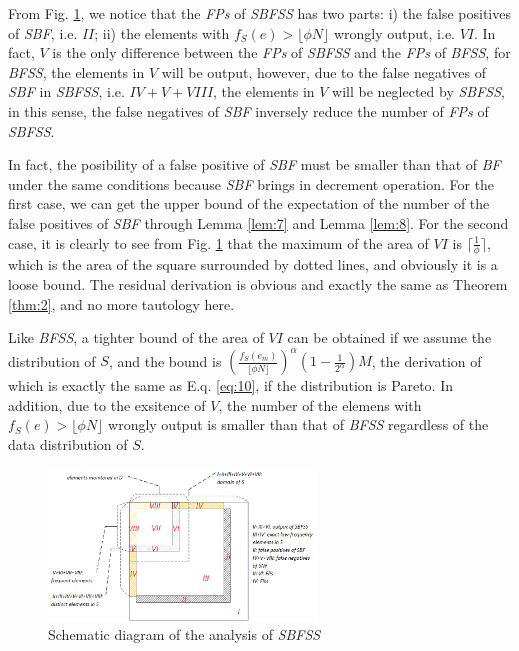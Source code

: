 \documentclass[conference]{IEEEtran}
\begin{document}
\begin{IEEEproof}
From Fig. \ref{fig:sbfss}, we notice that the \emph{FPs} of \emph{SBFSS} has two parts: i) the false positives of \emph{SBF}, i.e. $II$; ii) the elements with $f_S(e)>\lfloor\phi N\rfloor$ wrongly output, i.e. $VI$. In fact, $V$ is the only difference between the \emph{FPs} of \emph{SBFSS} and the \emph{FPs} of \emph{BFSS}, for \emph{BFSS}, the elements in $V$ will be output, however, due to the false negatives of \emph{SBF} in \emph{SBFSS}, i.e. $IV+V+VIII$, the elements in $V$ will be neglected by \emph{SBFSS}, in this sense, the false negatives of \emph{SBF} inversely reduce the number of \emph{FPs} of \emph{SBFSS}. \par
In fact, the posibility of a false positive of \emph{SBF} must be smaller than that of \emph{BF} under the same conditions because \emph{SBF} brings in decrement operation. For the first case, we can get the upper bound of the expectation of the number of the false positives of \emph{SBF} through Lemma \ref{lem:7} and Lemma \ref{lem:8}. For the second case, it is clearly to see from Fig. \ref{fig:sbfss} that the maximum of the area of $VI$ is $\lceil\frac{1}{\phi}\rceil$, which is the area of the square surrounded by dotted lines, and obviously it is a loose bound. The residual derivation is obvious and exactly the same as Theorem \ref{thm:2}, and no more tautology here.
\end{IEEEproof}
Like \emph{BFSS}, a tighter bound of the area of $VI$ can be obtained if we assume the distribution of $S$, and the bound is $(\frac{f_S(e_m)}{\lfloor \phi N\rfloor})^\alpha(1-\frac{1}{2^\alpha})M$, the derivation of which is exactly the same as E.q. \ref{eq:10}, if the distribution is Pareto. In addition, due to the exsitence of $V$, the number of the elemens with $f_S(e)>\lfloor\phi N\rfloor$ wrongly output is smaller than that of \emph{BFSS} regardless of the data distribution of $S$. 
\begin{figure}
	\centering
	\includegraphics[width=2.8in]{png/sbfss.png}
	\caption{Schematic diagram of the analysis of \emph{SBFSS}}
	\label{fig:sbfss}
\end{figure}
\end{document}
